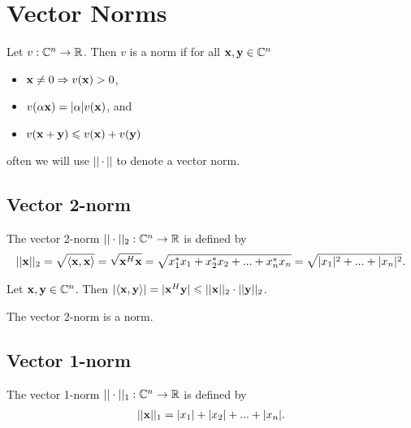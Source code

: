 \section{Vector Norms}
\begin{definition}{}{}
    Let $v:\mathbb{C}^n\rightarrow \mathbb{R}$. 
    Then $v$ is a norm if for all $\bold{x},\bold{y}\in\mathbb{C}^n$
    \begin{itemize}
        \item $\bold{x}\neq 0\Rightarrow v(\bold{x})>0$,
        \item $v(\alpha \bold{x})=|\alpha|v(\bold{x})$, and
        \item $v(\bold{x}+\bold{y})\leqslant v(\bold{x})+v(\bold{y})$ 
    \end{itemize}
\end{definition}
\begin{remark}
    often we will use $||\cdot||$ to denote a vector norm.
\end{remark}


\subsection{Vector 2-norm}
\begin{definition}{}{}
    The vector 2-norm $||\cdot||_2:\mathbb{C}^n\rightarrow \mathbb{R}$ is defined by
    \begin{align*}
        ||\bold{x}||_2=\sqrt{\langle\bold{x},\bold{x}\rangle}=\sqrt{\bold{x}^H\bold{x}}=\sqrt{x_1^*x_1+x_2^*x_2+...+x_n^*x_n}=\sqrt{|x_1|^2+...+|x_n|^2}.
    \end{align*}
\end{definition}

\begin{theorem}{}{}
    Let $\bold{x},\bold{y}\in\mathbb{C}^n$. Then $|\langle\bold{x},\bold{y}\rangle|=|\bold{x}^H\bold{y}|\leqslant ||\bold{x}||_2\cdot ||\bold{y}||_2$.
\end{theorem}

\begin{proposition}{}{}
    The vector 2-norm is a norm.
\end{proposition}

\subsection{Vector 1-norm}
\begin{definition}{}{}
    The vector 1-norm $||\cdot||_1:\mathbb{C}^n\rightarrow \mathbb{R}$ is defined by
    \begin{align*}
        ||\bold{x}||_1=|x_1|+|x_2|+...+|x_{n}|.
    \end{align*}
\end{definition}

